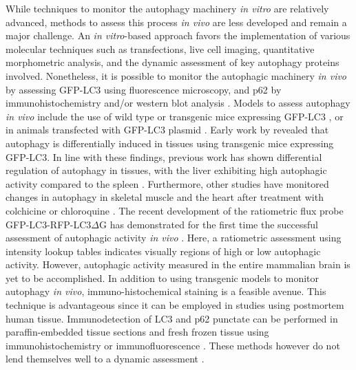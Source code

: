 While techniques to monitor the autophagy machinery \textit{in vitro} are relatively advanced, methods to assess this process \textit{in vivo} are less developed and remain a major challenge. An \textit{in vitro}-based approach favors the implementation of various molecular techniques such as transfections, live cell imaging, quantitative morphometric analysis, and the dynamic assessment of key autophagy proteins involved. Nonetheless, it is possible to monitor the autophagic machinery \textit{in vivo} by assessing GFP-LC3 using fluorescence microscopy, and p62 by immunohistochemistry and/or western blot analysis \citep{klionsky2016}. Models to assess autophagy \textit{in vivo} include the use of wild type or transgenic mice expressing GFP-LC3 \citep{Mizushima2004a,Rodriguez-Muela2012}, or in animals transfected with GFP-LC3 plasmid \citep{Mammucari2007}. Early work by \citet{Mizushima2004a} revealed that autophagy is differentially induced in tissues using transgenic mice expressing GFP-LC3. In line with these findings, previous work has shown differential regulation of autophagy in tissues, with the liver exhibiting high autophagic activity compared to the spleen \citep{Haspel2011}. Furthermore, other studies have monitored changes in autophagy in skeletal muscle and the heart after treatment with colchicine \citep{Ju2010} or chloroquine \citep{Kanamori2015}. The recent development of the ratiometric flux probe GFP-LC3-RFP-LC3$\Delta$G has demonstrated for the first time the successful assessment of autophagic activity \textit{in vivo} \citep{Kaizuka2016}. Here, a ratiometric assessment using intensity lookup tables indicates visually regions of high or low autophagic activity. However, autophagic activity measured in the entire mammalian brain is yet to be accomplished. In addition to using transgenic models to monitor autophagy \textit{in vivo}, immuno-histochemical staining is a feasible avenue. This technique is advantageous since it can be employed in studies using postmortem human tissue. Immunodetection of LC3 and p62 punctate can be performed in paraffin-embedded tissue sections and fresh frozen tissue using immunohistochemistry or immunofluorescence \citep{He2016,Holt2011,Martinet2006,Schlafli2015}. These methods however do not lend themselves well to a dynamic assessment \citep{klionsky2016}.

